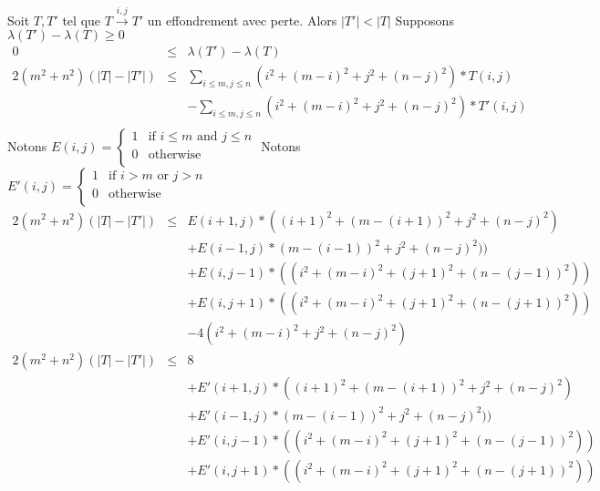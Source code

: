 Soit $T,T'$ tel que $T\xrightarrow{i,j}T'$ un effondrement avec perte.
Alors $|T'|<|T|$ Supposons $\lambda(T') - \lambda(T) \geq 0$
\begin{eqnarray*}
  0 & \leq & \lambda(T') - \lambda(T) \\
  2(m^2+n^2)(|T|-|T'|) & \leq & \sum_{i\leq m,j\leq n} (i^2 + (m-i)^2 + j^2 + (n-j)^2)*T(i,j) \\
  & & - \sum_{i\leq m,j\leq n} (i^2 + (m-i)^2 + j^2 + (n-j)^2)*T'(i,j) \\
\end{eqnarray*}
Notons $E(i,j) = \left\{\begin{array}{ll}
    1 & \mbox{if } i\leq m \mbox{ and } j\leq n\\
    0  & \mbox{otherwise} \\
\end{array}\right. $
Notons $E'(i,j) = \left\{\begin{array}{ll}
    1 & \mbox{if } i > m \mbox{ or } j > n\\
    0  & \mbox{otherwise} \\
\end{array}\right. $
\begin{eqnarray*}
  2(m^2+n^2)(|T|-|T'|) & \leq & E(i+1,j) * ((i+1)^2 + (m-(i+1))^2 + j^2 + (n-j)^2) \\
  && +  E(i-1,j) *(m-(i-1))^2 + j^2 + (n-j)^2)) \\
  && +  E(i,j-1) *((i^2 + (m-i)^2 + (j+1)^2 + (n-(j-1))^2)) \\
  && +  E(i,j+1) *((i^2 + (m-i)^2 + (j+1)^2 + (n-(j+1))^2)) \\
  && - 4(i^2 + (m-i)^2 + j^2 + (n-j)^2)\\
  2(m^2+n^2)(|T|-|T'|) & \leq & 8 \\
  && +  E'(i+1,j) * ((i+1)^2 + (m-(i+1))^2 + j^2 + (n-j)^2) \\
  && +  E'(i-1,j) *(m-(i-1))^2 + j^2 + (n-j)^2)) \\
  && +  E'(i,j-1) *((i^2 + (m-i)^2 + (j+1)^2 + (n-(j-1))^2)) \\
  && +  E'(i,j+1) *((i^2 + (m-i)^2 + (j+1)^2 + (n-(j+1))^2)) \\
\end{eqnarray*}

